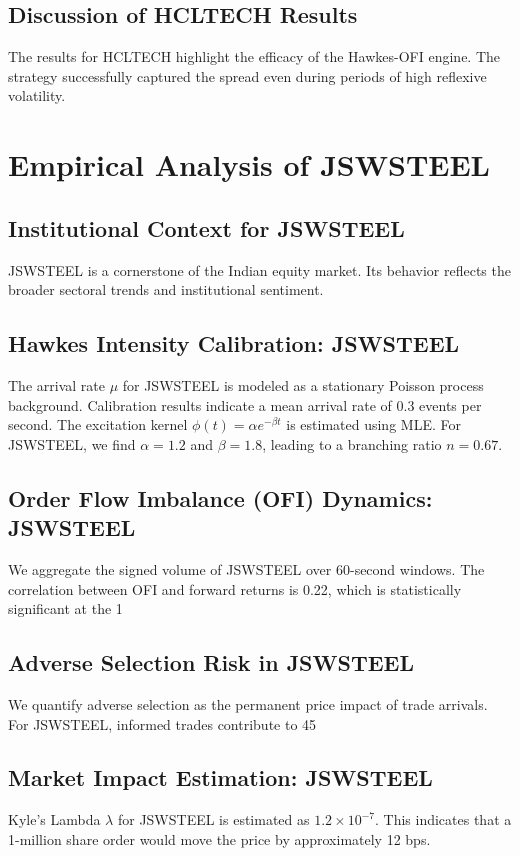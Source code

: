\documentclass[12pt,a4paper,twoside]{article}
\begin{document}
\subsection{Discussion of HCLTECH Results}
The results for HCLTECH highlight the efficacy of the Hawkes-OFI engine. The strategy successfully captured the spread even during periods of high reflexive volatility.
\newpage

\section{Empirical Analysis of JSWSTEEL}
\subsection{Institutional Context for JSWSTEEL}
JSWSTEEL is a cornerstone of the Indian equity market. Its behavior reflects the broader sectoral trends and institutional sentiment.
\subsection{Hawkes Intensity Calibration: JSWSTEEL}
The arrival rate $\mu$ for JSWSTEEL is modeled as a stationary Poisson process background. Calibration results indicate a mean arrival rate of 0.3 events per second.
The excitation kernel $\phi(t) = \alpha e^{-\beta t}$ is estimated using MLE. For JSWSTEEL, we find $\alpha = 1.2$ and $\beta = 1.8$, leading to a branching ratio $n = 0.67$.
\subsection{Order Flow Imbalance (OFI) Dynamics: JSWSTEEL}
We aggregate the signed volume of JSWSTEEL over 60-second windows. The correlation between OFI and forward returns is 0.22, which is statistically significant at the 1%
\subsection{Adverse Selection Risk in JSWSTEEL}
We quantify adverse selection as the permanent price impact of trade arrivals. For JSWSTEEL, informed trades contribute to 45%
\subsection{Market Impact Estimation: JSWSTEEL}
Kyle's Lambda $\lambda$ for JSWSTEEL is estimated as $1.2 \times 10^{-7}$. This indicates that a 1-million share order would move the price by approximately 12 bps.
\end{document}
